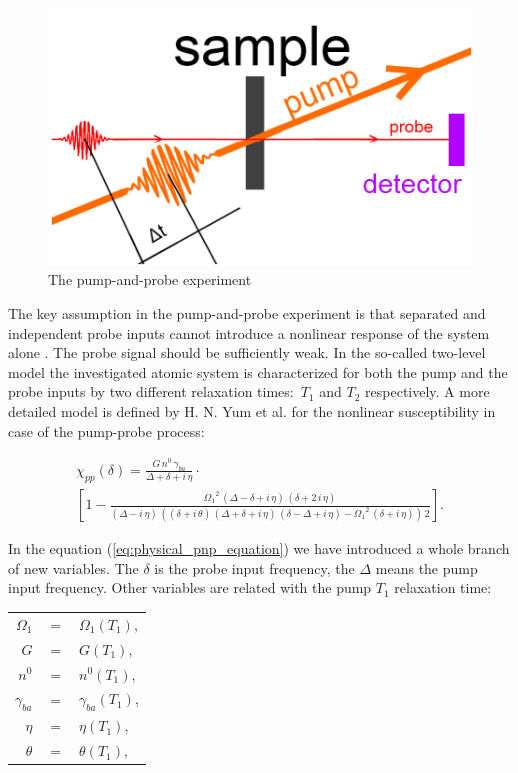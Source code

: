 \documentclass[12pt,twoside,a4paper]{article}
\numberwithin{equation}{subsection}
\numberwithin{figure}{subsection}
\begin{document}
\begin{figure} 
  \includegraphics{img/pnp.png}
  \caption{The pump-and-probe experiment\label{fig:physical_pnp_fig}}
\end{figure}

The key assumption in the pump-and-probe experiment is that separated and independent probe inputs cannot introduce a nonlinear
response of the system alone \cite{boyd_nlo}. The probe signal should be sufficiently weak. In the so-called two-level model the
investigated atomic system is characterized for both the pump and the probe inputs by two different relaxation times:~${T_{1}}$ 
and ${T_{2}}$ respectively. A more detailed model is defined by H. N. Yum et al. \cite{yum_pump} for the nonlinear susceptibility in
case of the pump-probe process:

\begin{multline}   \label{eq:physical_pnp_equation}
     {\chi_{pp}}(\delta ) = \frac {G\,n^{0}\,{\gamma_{ba}}}{\Delta  + \delta  + i\,\eta } \cdot \\
     [1 - \frac {{\Omega_{1}}^{2}\,(\Delta  - \delta  + i\,\eta )\,(\delta  + 2\,i\,\eta )}{(\Delta  - i\,\eta )\,((\delta  + i\,
     \theta)\,(\Delta  + \delta  + i\,\eta )\,(\delta  - \Delta  + i\,\eta ) - {\Omega_{1}}^{2}\,(\delta  + i\,\eta ))\,2}].
\end{multline}

In the equation (\ref{eq:physical_pnp_equation}) we have introduced a whole branch of new variables. The $\delta $ is the probe
input frequency, the $\Delta $ means the pump input frequency. Other variables are related with the pump $ T_{1} $ relaxation time:

\begin{tabular} {r c l}
	$ \Omega_{1} $  & $ = $ & $ \Omega_{1} ( T_{1} )$, \\
	$ G $           & $ = $ & $  G ( T_{1} )$, \\
	$ n^{0} $       & $ = $ & $  n^{0} ( T_{1} )$, \\
	$ \gamma_{ba} $ & $ = $ & $  \gamma_{ba} ( T_{1} )$, \\
	$ \eta $        & $ = $ & $  \eta ( T_{1} )$, \\
	$ \theta $      & $ = $ & $  \theta ( T_{1} )$, \\
\end{tabular}
\end{document}
